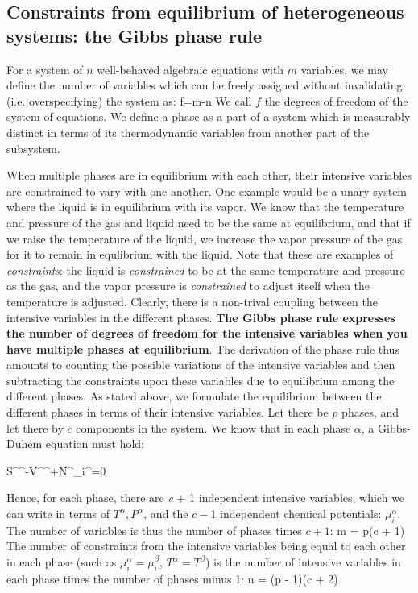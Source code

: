 \documentclass[12pt]{article}
\begin{document}
\subsection{Constraints from equilibrium of heterogeneous systems: the Gibbs phase rule} \label{phaseRule}
For a system of $n$ well-behaved algebraic equations with $m$ variables, we may define the number of variables which can be freely assigned without invalidating (i.e. overspecifying) the system as:
\eqs f=m-n \eqe
We call $f$ the degrees of freedom of the system of equations. We define a phase as a part of a system which is measurably distinct in terms of its thermodynamic variables from another part of the subsystem.

When multiple phases are in equilibrium with each other, their intensive variables are constrained to vary with one another. One example would be a unary system where the liquid is in equilibrium with its vapor. We know that the temperature and pressure of the gas and liquid need to be the same at equilibrium, and that if we raise the temperature of the liquid, we increase the vapor pressure of the gas for it to remain in equlibrium with the liquid. Note that these are examples of \emph{constraints}: the liquid is \emph{constrained} to be at the same temperature and pressure as the gas, and the vapor pressure is \emph{constrained} to adjust itself when the temperature is adjusted. Clearly, there is a non-trival coupling between the intensive variables in the different phases. \textbf{The Gibbs phase rule expresses the number of degrees of freedom for the intensive variables when you have multiple phases at equilibrium}. The derivation of the phase rule thus amounts to counting the possible variations of the intensive variables and then subtracting the constraints upon these variables due to equilibrium among the different phases.
As stated above, we formulate the equilibrium between the different phases in terms of their intensive variables. Let there be $p$ phases, and let there by $c$ components in the system. We know that in each phase $\alpha$, a Gibbs-Duhem equation must hold:

\eqs
S^{\alpha }^{\alpha }-V^{\alpha }^{\alpha }+N^{\alpha }_i^{\alpha }=0\eqe

Hence, for each phase, there are \textit{ c} + 1 independent intensive variables, which we can write in terms of $T^{\alpha },P^{\alpha }$, and the $c-1$ independent chemical potentials: $\mu _i^{\alpha}$. The number of variables is thus the number of phases times $c + 1$: 
\eqs m = p(c + 1) \eqe
The number of constraints from the intensive variables being equal to each other in each phase (such as $\mu_i^\alpha = \mu_i^\beta$, $T^\alpha=T^\beta$) is the number of intensive variables in each phase
times the number of phases minus 1:
\eqs n = (p - 1)(c + 2) \eqe
\end{document}
